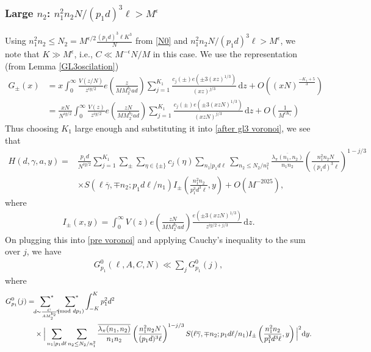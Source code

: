 \documentclass[12pt,a4paper,twoside, reqno]{amsart}
\newcommand{\shortmod}{\ensuremath{\negthickspace \negthickspace \negthickspace \pmod}}
\newcommand{\sumstar}{\sideset{}{^*}\sum}
\begin{document}
\subsubsection{Large  $n_2$: $ n_1^2n_2N/(p_1d)^3 \ell > M^\epsilon$ } Using 
$n_1^2n_2 \leq N_2 =  M^{\epsilon/2}\frac{(p_1d)^3 \ell K^3 }{ N} $ from \eqref{N0} and  $n_1^2n_2N/(p_1d)^3 \ell > M^\epsilon $, we note that $K \gg M^{\epsilon}$, i.e., $C \ll M^{-\epsilon}N/M$ in this case. We use the representation (from Lemma \ref{GL3oscilation})
\begin{align*}
		G_{\pm}(x) &=  x \int_{0}^{\infty} \frac{V(z/N)}{z^{iy/2}}  e\left(\frac{ z}{MM_2^{b_2}ad} \right) \sum_{j=1}^{K_1} \frac{c_{j}({\pm}) e\left(\pm 3 (xz)^{1/3} \right)}{\left( xz\right)^{j/3}} \, \mathrm{d} z + O \left((xN)^{\frac{-K_1+5}{3}}\right) \\
        &=  \frac{xN}{N^{iy/2}} \int_{0}^{\infty} \frac{V(z)}{z^{iy/2}}  e\left(\frac{ zN }{MM_2^{b_2}ad} \right) \sum_{j=1}^{K_1} \frac{c_{j}({\pm}) e\left(\pm 3 (xzN)^{1/3} \right)}{\left( xzN\right)^{j/3}} \, \mathrm{d} z + O \left( \frac{1}{M^{\epsilon K_1}}\right)
	\end{align*}
    Thus choosing $K_1$ large enough and substituting  it   into \ref{after gl3 voronoi}, we see that 
\begin{align*}
    H(d, \gamma,a,y)=&\frac{p_1d}{ N^{iy/2}}  \sum_{j=1}^{K_1} \sum_{\pm} \sum_{\eta \in \{ \pm\}} c_j(\eta) \sum_{n_1|p_1d\ell} \sum_{n_2 \leq N_2/n_1^2} \frac{\overline{\lambda_\pi(n_1,n_2)}}{n_1n_2} \left(\frac{n_1^2 n_2N}{(p_1d)^3 \ell} \right)^{1-j/3} \\
    & \times S(\ell \overline{\gamma}, \mp n_2;p_1d\ell /n_1 )I_{\pm} \left( \frac{n_1^2n_2}{p_1^3d^3 \ell},y\right) +O(M^{- 2025}),
\end{align*}
where 
\begin{align}
    I_{\pm} \left( x,y\right)=\int_{0}^{\infty} {V(z )}{^{}}  e\left(\frac{ z N}{MM_2^{b_2}ad} \right)  \frac{  e\left(\pm 3 (xzN)^{1/3} \right)}{ z^{iy/2+j/3}} \, \mathrm{d} z.
\end{align}
On plugging this into \eqref{pre voronoi} and applying Cauchy's inequality to the sum over $j$, we have 
\begin{align}
     G_{p_1}^0(\ell, A,C,N) \ll   \sum_j    G_{p_1}^0(j),
\end{align}
where 
\begin{align}
       G_{p_1}^0(j)=&
      \mathop{\sumstar_{ \substack{d \sim \frac{C}{A M_2^{b_2}}
       } } }   \sumstar_{\substack{ \gamma \shortmod{dp_1} }  } \int_{-K}^K p_1^2d^2 \\ 
       & \times \Big| \sum_{n_1|p_1d\ell} \sum_{n_2 \leq N_2/n_1^2} \frac{\overline{\lambda_\pi(n_1,n_2)}}{n_1n_2} \left(\frac{n_1^2 n_2N}{(p_1d)^3 \ell} \right)^{1-j/3}S(\ell \overline{\gamma}, \mp n_2;p_1d\ell /n_1 )I_{\pm} \left( \frac{n_1^2n_2}{p_1^3d^3 \ell},y\right)  \Big|^2 \mathrm{d}y.
\end{align}
\end{document}
